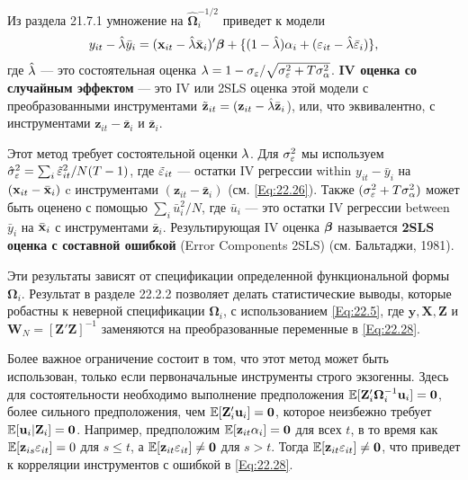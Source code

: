 Из раздела 21.7.1 умножение на  $\hat{\bm\Omega}^{-1/2}_i$ приведет к модели
\begin{align}
y_{it}-\hat{\lambda}\bar{y}_i=(\mathbf{x}_{it}-\hat{\lambda}\bar{\mathbf{x}}_i)'\bm{\beta}+\{(1-\hat{\lambda})\alpha_i+(\varepsilon_{it}-\hat{\lambda}\bar{\varepsilon}_i)\},
\label{Eq:22.28}
\end{align}
где $\hat{\lambda}$ --- это состоятельная оценка $\lambda=1-\sigma_{\varepsilon}/\sqrt{\sigma^2_{\varepsilon}+T\sigma^2_{\alpha}}$. \textbf{IV оценка со случайным эффектом} --- это IV или 2SLS оценка этой модели с преобразованными инструментами $\tilde{\mathbf z}_{it}=(\mathbf z_{it} - \hat{\lambda} \bar{\mathbf z}_i$), или, что эквивалентно, с инструментами $\mathbf z_{it} - \bar{\mathbf z}_i$ и $\bar{\mathbf z}_i$.

Этот метод требует состоятельной оценки $\lambda$. Для $\sigma^2_{\varepsilon}$ мы используем $\hat{\sigma}^2_{\varepsilon}=\sum_i \tilde{\varepsilon}^2_{it}/N(T-1)$, где $\tilde{\varepsilon}_{it}$ --- остатки IV регрессии within $y_{it}-\bar{y}_i$ на $(\mathbf{x}_{it}-\bar{\mathbf{x}}_i)$ c инструментами $(\mathbf z_{it} - \bar{\mathbf z}_i)$ (см. \ref{Eq:22.26}). Также $(\sigma^2_{\varepsilon}+T\sigma^2_{\alpha})$ может быть оценено с помощью $\sum_i \bar{u}^2_i/N$, где $\bar{u}_i$ --- это остатки IV регрессии between $\bar{y}_i$ на $\bar{\mathbf{x}}_i$ с инструментами $\bar{\mathbf z}_i$. Результирующая IV оценка $\bm{\beta}$ называется \textbf{2SLS оценка с составной ошибкой} (Error Components 2SLS) (см. Бальтаджи, 1981).

Эти результаты зависят от спецификации определенной функциональной формы $\bm\Omega_i$. Результат в разделе 22.2.2 позволяет делать статистические выводы, которые робастны к неверной спецификации $\bm\Omega_i$, с использованием \ref{Eq:22.5}, где $\mathbf y, \mathbf X, \mathbf Z$ и $\mathbf W_N=[\mathbf Z' \mathbf Z]^{-1}$ заменяются на преобразованные переменные в \ref{Eq:22.28}.

Более важное ограничение состоит в том, что этот метод может быть использован, только если первоначальные инструменты строго экзогенны. Здесь для состоятельности необходимо выполнение предположения $\mathbb{E}[\mathbf Z'_i \bm\Omega^{-1}_i \mathbf u_i]=\mathbf 0$, более сильного предположения, чем $\mathbb{E}[\mathbf Z'_i \mathbf u_i]=\mathbf 0$, которое неизбежно требует $\mathbb{E}[\mathbf u_i| \mathbf Z_i]= \mathbf 0$. Например, предположим $\mathbb{E}[\mathbf z_{it} \alpha_i]=\mathbf 0$ для всех $t$, в то время как $\mathbb{E}[\mathbf z_{is} \varepsilon_{it}]=0$ для $ s \leq t$, а $\mathbb{E}[ \mathbf z_{it} \varepsilon_{it}] \neq \mathbf 0$ для $s > t$. Тогда $\mathbb{E}[\mathbf z_{it} \varepsilon_{it}] \neq \mathbf 0$, что приведет к корреляции инструментов с ошибкой в \ref{Eq:22.28}.

